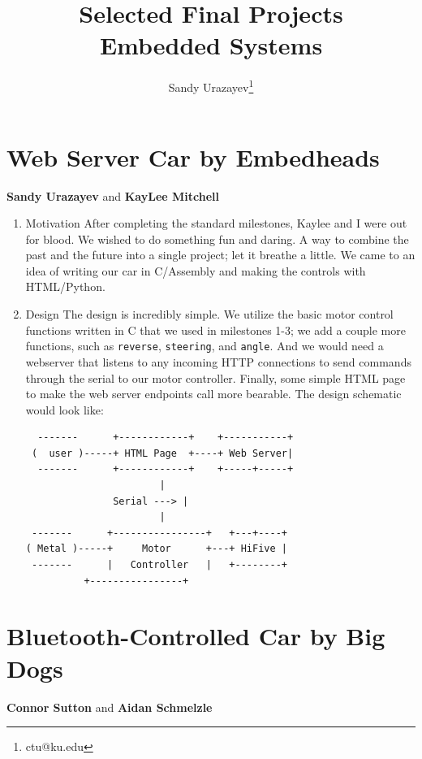 \documentclass[11pt]{article}
\author{Sandy Urazayev\thanks{ctu@ku.edu}}
\date{}
\title{Selected Final Projects\\\medskip
\large Embedded Systems}
\begin{document}
\maketitle
\tableofcontents


\section{Web Server Car by Embedheads}
\label{sec:org5a6634c}
\textbf{Sandy Urazayev} and \textbf{KayLee Mitchell}

\begin{enumerate}
\item Motivation
\label{sec:org3c18a1a}
After completing the standard milestones, Kaylee and I were out for blood. We
wished to do something fun and daring. A way to combine the past and the
future into a single project; let it breathe a little. We came to an idea of
writing our car in C/Assembly and making the controls with HTML/Python.

\item Design
\label{sec:org27cae87}
The design is incredibly simple. We utilize the basic motor control functions
written in C that we used in milestones 1-3; we add a couple more functions,
such as \texttt{reverse}, \texttt{steering}, and \texttt{angle}. And we would need a webserver that
listens to any incoming HTTP connections to send commands through the serial
to our motor controller. Finally, some simple HTML page to make the web
server endpoints call more bearable. The design schematic would look like:

\begin{verbatim}
  -------      +------------+  	 +-----------+
 (  user )-----+ HTML Page  +----+ Web Server|
  -------      +------------+  	 +-----+-----+
				       |
			   Serial ---> |
				       |
 -------      +----------------+   +---+----+
( Metal )-----+     Motor      +---+ HiFive |
 -------      |   Controller   |   +--------+
	      +----------------+
\end{verbatim}
\end{enumerate}

\section{Bluetooth-Controlled Car by Big Dogs}
\label{sec:org7905014}
\textbf{Connor Sutton} and \textbf{Aidan Schmelzle}
\end{document}
